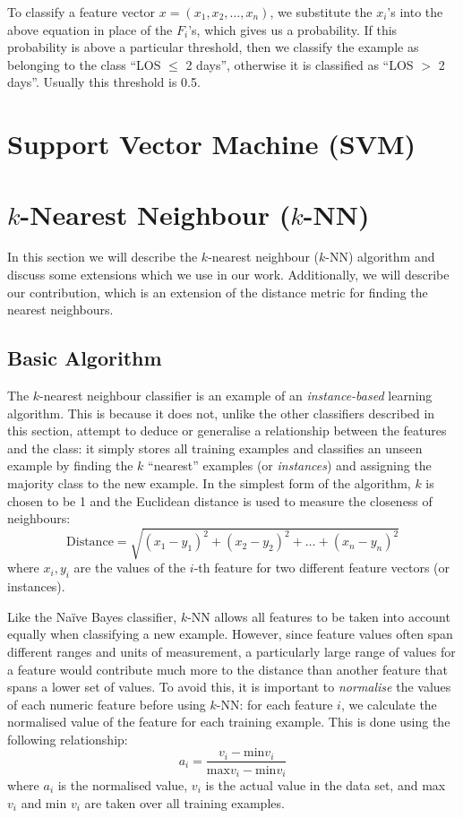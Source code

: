 To classify a feature vector $x = (x_1,x_2,\ldots,x_n)$, we substitute the
$x_i$'s into the above equation in place of the $F_i$'s, which gives us a
probability. If this probability is above a particular threshold, then we
classify the example as belonging to the class ``LOS $\leq$ 2 days'', otherwise
it is classified as ``LOS $>$ 2 days''. Usually this threshold is 0.5.

\section{Support Vector Machine (SVM)}

\section{$k$-Nearest Neighbour ($k$-NN)}
In this section we will describe the $k$-nearest neighbour ($k$-NN) algorithm
and discuss some extensions which we use in our work. Additionally, we will
describe our contribution, which is an extension of the distance metric for
finding the nearest neighbours.

\subsection{Basic Algorithm}
The $k$-nearest neighbour classifier is an example of an
\textit{instance-based} learning algorithm. This is because it does not, unlike
the other classifiers described in this section, attempt to deduce or
generalise a relationship between the features and the class: it simply stores
all training examples and classifies an unseen example by finding the $k$
``nearest'' examples (or \textit{instances}) and assigning the majority class
to the new example. In the simplest form of the algorithm, $k$ is chosen to be
1 and the Euclidean distance is used to measure the closeness of neighbours:
\begin{equation*}
\mathrm{Distance} = \sqrt{(x_1-y_1)^2 + (x_2-y_2)^2 + \ldots + (x_n-y_n)^2}
\end{equation*}
where $x_i,y_i$ are the values of the $i$-th feature for two different feature
vectors (or instances).

Like the Na\"{i}ve Bayes classifier, $k$-NN allows all features to be taken
into account equally when classifying a new example. However, since feature
values often span different ranges and units of measurement, a particularly
large range of values for a feature would contribute much more to the distance
than another feature that spans a lower set of values.
To avoid this, it is important to \textit{normalise} the
values of each numeric feature before using $k$-NN: for each feature $i$, we
calculate the normalised value of the feature for each training example. This
is done using the following relationship:
\begin{equation*}
a_i = \dfrac{v_i - \mathrm{min }v_i}{\mathrm{max }v_i - \mathrm{min }v_i}
\end{equation*}
where $a_i$ is the normalised value, $v_i$ is the actual value in the data
set, and max $v_i$ and min $v_i$ are taken over all training examples.

